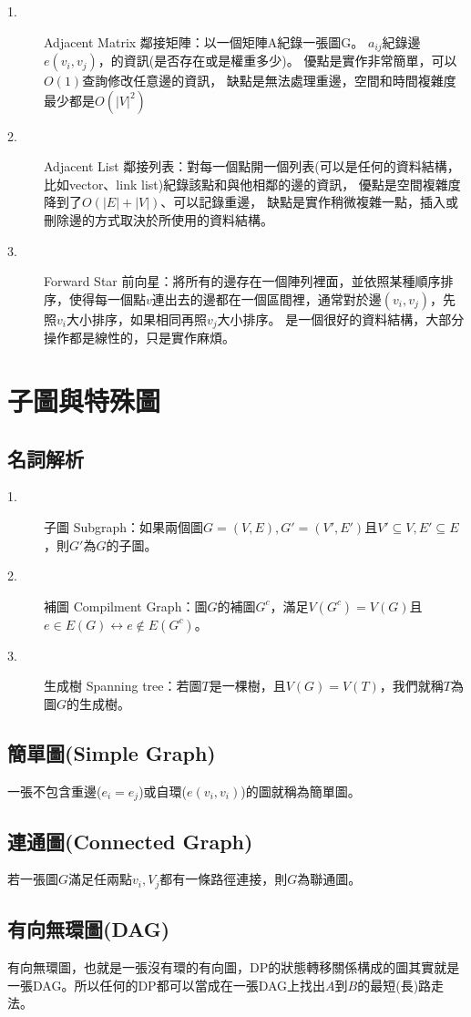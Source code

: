 \documentclass{article}
\begin{document}
\begin{description}
\item[ 1.]Adjacent Matrix 鄰接矩陣：以一個矩陣A紀錄一張圖G。
$a_{ij}$紀錄邊$e(v_i,v_j)$，的資訊(是否存在或是權重多少)。
優點是實作非常簡單，可以$O(1)$查詢修改任意邊的資訊，
缺點是無法處理重邊，空間和時間複雜度最少都是$O(|V|^2)$
\item[ 2.]Adjacent List 鄰接列表：對每一個點開一個列表(可以是任何的資料結構，比如vector、link list)紀錄該點和與他相鄰的邊的資訊，
優點是空間複雜度降到了$O(|E|+|V|)$、可以記錄重邊，
缺點是實作稍微複雜一點，插入或刪除邊的方式取決於所使用的資料結構。
\item[ 3.]Forward Star 前向星：將所有的邊存在一個陣列裡面，並依照某種順序排序，使得每一個點$v$連出去的邊都在一個區間裡，通常對於邊$(v_i,v_j)$，先照$v_i$大小排序，如果相同再照$v_j$大小排序。
是一個很好的資料結構，大部分操作都是線性的，只是實作麻煩。
\end{description}


\section{子圖與特殊圖}
\subsection{名詞解析}
\begin{description}
\item[ 1.]子圖 Subgraph：如果兩個圖$G = (V,E), G' = (V',E')$且$V' \subseteq V, E' \subseteq E$，則$G'$為$G$的子圖。
\item[ 2.]補圖 Compilment Graph：圖$G$的補圖$G^c$，滿足$V(G^c) = V(G)$且$e \in E(G) \leftrightarrow e \notin E(G^c)$。
\item[ 3.]生成樹 Spanning tree：若圖$T$是一棵樹，且$V(G) = V(T)$，我們就稱$T$為圖$G$的生成樹。
\end{description}

\subsection{簡單圖(Simple Graph)}
一張不包含重邊($e_i = e_j $)或自環($e(v_i,v_i)$)的圖就稱為簡單圖。

\subsection{連通圖(Connected Graph)}
若一張圖$G$滿足任兩點$v_i,V_j$都有一條路徑連接，則$G$為聯通圖。

\subsection{有向無環圖(DAG)}
有向無環圖，也就是一張沒有環的有向圖，DP的狀態轉移關係構成的圖其實就是一張DAG。所以任何的DP都可以當成在一張DAG上找出$A$到$B$的最短(長)路走法。
\end{document}

